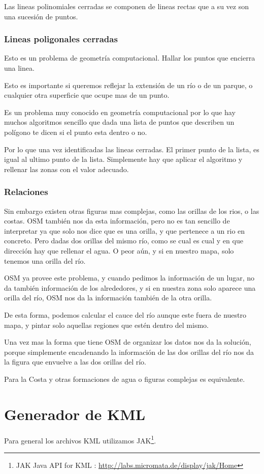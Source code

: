Las lineas polinomiales cerradas se componen de lineas rectas que a su vez son
una sucesión de puntos.

\subsubsection*{Lineas poligonales cerradas}
Esto es un problema de geometría computacional. Hallar los puntos que encierra
una linea.

Esto es importante si queremos reflejar la extensión de un río o de un parque,
o cualquier otra superficie que ocupe mas de un punto.

Es un problema muy conocido en geometría computacional por lo que hay muchos
algoritmos sencillo que dada una lista de
puntos que describen un polígono te dicen si el punto esta dentro o no.

Por lo que una vez identificadas las lineas cerradas. El primer punto de la
lista, es igual al ultimo punto de la lista. Simplemente hay que aplicar el
algoritmo y rellenar las zonas con el valor adecuado.
\subsubsection*{Relaciones}
Sin embargo existen otras figuras mas complejas, como las orillas de los rios,
o las costas. OSM también nos da esta información, pero no es tan sencillo de
interpretar ya que solo nos dice que es una orilla, y que pertenece a un rio en
concreto.
Pero dadas dos orillas del mismo río, como se cual es cual y en que dirección
hay que rellenar el agua. O peor aún, y si en nuestro mapa, solo tenemos una
orilla del río.

OSM ya provee este problema, y cuando pedimos la información de un lugar, no da
también información de los alrededores, y si en nuestra zona solo aparece una
orilla del río, OSM nos da la información también de la otra orilla.

De esta forma, podemos calcular el cauce del río aunque este fuera de nuestro
mapa, y pintar solo aquellas regiones que estén dentro del mismo.

Una vez mas la forma que tiene OSM de organizar los datos nos da la solución,
porque simplemente encadenando la información de las dos orillas del río nos da
la figura que envuelve a las dos orillas del río.

Para la Costa y otras formaciones de agua o figuras complejas es equivalente.
\section*{Generador de KML}
Para general los archivos KML utilizamos
JAK\footnote{JAK Java API for KML :
\url{http://labs.micromata.de/display/jak/Home}}.
